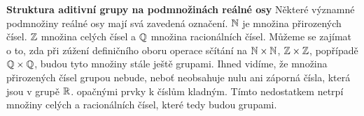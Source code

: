 \begin{mdframed}[style=mdexam]
  \begin{example}\label{mai:exam049}
    \textbf{Struktura aditivní grupy na podmnožinách reálné osy}\newline
      Některé významné podmnožiny reálné osy mají svá zavedená označení. \(\mathbb{N}\) je množina 
      přirozených čísel. \(\mathbb{Z}\) množina celých čísel a \(\mathbb{Q}\) množina racionálních 
      čísel. Můžeme se zajímat o to, zda při zúžení definičního oboru operace sčítání na 
      \(\mathbb{N} \times \mathbb{N}\), \(\mathbb{Z} \times \mathbb{Z}\), popřípadě \(\mathbb{Q} \times 
      \mathbb{Q}\), budou tyto množiny stále ještě grupami. Ihned vidíme, že množina přirozených 
      čísel grupou nebude, neboť neobsahuje nulu ani záporná čísla, která jsou v grupě \(\mathbb{R}\). 
      opačnými prvky k číslům kladným. Tímto nedostatkem netrpí množiny celých a racionálních čísel, 
      které tedy budou grupami.
  \end{example}
\end{mdframed}